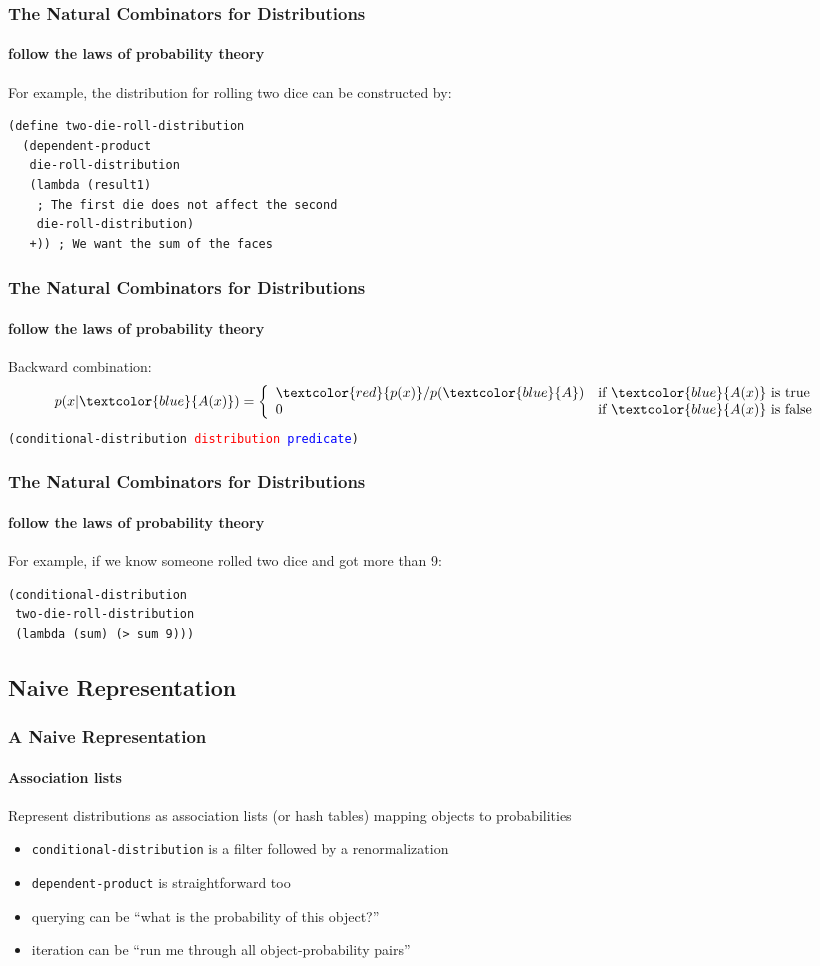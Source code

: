 \documentclass{beamer}
\newcommand{\code}[1]{\texttt{#1}}
\newcommand{\startor}{\left\{ \begin{array}{ll}}
\newcommand{\stopor}{\end{array} \right.}
\newcommand{\red}[1]{\textcolor{red}{#1}}
\newcommand{\blue}[1]{\textcolor{blue}{#1}}
\begin{document}
\begin{frame}[fragile=singleslide]
  \frametitle{The Natural Combinators for Distributions}
  \framesubtitle{follow the laws of probability theory}
  For example, the distribution for rolling two dice can be constructed by:
\begin{verbatim}
(define two-die-roll-distribution
  (dependent-product
   die-roll-distribution
   (lambda (result1)
    ; The first die does not affect the second
    die-roll-distribution)
   +)) ; We want the sum of the faces
\end{verbatim}

\end{frame}

\begin{frame}
  \frametitle{The Natural Combinators for Distributions}
  \framesubtitle{follow the laws of probability theory}
  Backward combination:
\[ p(x|\blue{A(x)}) = \startor
\red{p(x)} / p(\blue{A}) & \textrm{if $\blue{A(x)}$ is true} \\
0 &                        \textrm{if $\blue{A(x)}$ is false} \\
\stopor \]
  \code{(conditional-distribution \red{distribution} \blue{predicate})}
\end{frame}

\begin{frame}[fragile=singleslide]
  \frametitle{The Natural Combinators for Distributions}
  \framesubtitle{follow the laws of probability theory}
  For example, if we know someone rolled two dice and got more than 9:
\begin{verbatim}
(conditional-distribution
 two-die-roll-distribution
 (lambda (sum) (> sum 9)))
\end{verbatim}
\end{frame}

\subsection{Naive Representation}

\begin{frame}
  \frametitle{A Naive Representation}
  \framesubtitle{Association lists}

  Represent distributions as association lists (or hash tables)
  mapping objects to probabilities
  \begin{itemize}
  \item \code{conditional-distribution} is a filter followed by
  a renormalization
  \item \code{dependent-product} is straightforward too
  \item querying can be ``what is the probability of this object?''
  \item iteration can be ``run me through all object-probability pairs''
  \end{itemize}
\end{frame}
\end{document}
